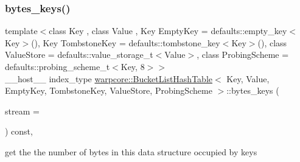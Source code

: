 \subsubsection{\texorpdfstring{bytes\+\_\+keys()}{bytes\_keys()}}
{\footnotesize\ttfamily template$<$class Key , class Value , Key Empty\+Key = defaults\+::empty\+\_\+key$<$\+Key$>$(), Key Tombstone\+Key = defaults\+::tombstone\+\_\+key$<$\+Key$>$(), class Value\+Store  = defaults\+::value\+\_\+storage\+\_\+t$<$\+Value$>$, class Probing\+Scheme  = defaults\+::probing\+\_\+scheme\+\_\+t$<$\+Key, 8$>$$>$ \\
\+\_\+\+\_\+host\+\_\+\+\_\+ index\+\_\+type \hyperlink{classwarpcore_1_1BucketListHashTable}{warpcore\+::\+Bucket\+List\+Hash\+Table}$<$ Key, Value, Empty\+Key, Tombstone\+Key, Value\+Store, Probing\+Scheme $>$\+::bytes\+\_\+keys (\begin{DoxyParamCaption}\item[{const cuda\+Stream\+\_\+t}]{stream = {} }\end{DoxyParamCaption}) const\hspace{0.3cm}{\ttfamily [inline]}, {\ttfamily [noexcept]}}



get the the number of bytes in this data structure occupied by keys 


